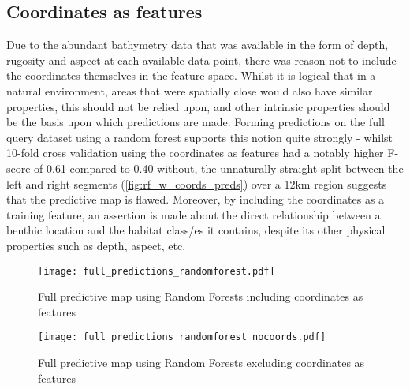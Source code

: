 \subsection{Coordinates as features}
Due to the abundant bathymetry data that was available in the form of depth, rugosity and aspect at each available data point, there was reason not to include the coordinates themselves in the feature space. Whilst it is logical that in a natural environment, areas that were spatially close would also have similar properties, this should not be relied upon, and other intrinsic properties should be the basis upon which predictions are made. Forming predictions on the full query dataset using a random forest supports this notion quite strongly - whilst 10-fold cross validation using the coordinates as features had a notably higher F-score of 0.61 compared to 0.40 without, the unnaturally straight split between the left and right segments (\autoref{fig:rf_w_coords_preds}) over a 12km region suggests that the predictive map is flawed. Moreover, by including the coordinates as a training feature, an assertion is made about the direct relationship between a benthic location and the habitat class/es it contains, despite its other physical properties such as depth, aspect, etc. 

\begin{figure}[H]
    \begin{minipage}{.49\linewidth}
        \texttt{[image: full\_predictions\_randomforest.pdf]}
        \caption{Full predictive map using Random Forests including coordinates as features}
        \label{fig:rf_w_coords_preds}
    \end{minipage}
    \hfill
    \begin{minipage}{.49\linewidth}
        \texttt{[image: full\_predictions\_randomforest\_nocoords.pdf]}
        \caption{Full predictive map using Random Forests excluding coordinates as features}
        \label{fig:rf_wo_coords_preds}
    \end{minipage}
\end{figure}

